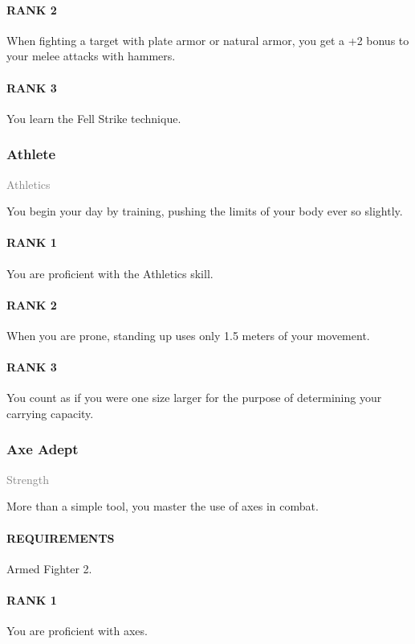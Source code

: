 \paragraph{RANK 2} When fighting a target with plate armor or natural armor, you get a +2 bonus to your melee attacks with hammers.
\paragraph{RANK 3} You learn the Fell Strike technique.

\subsubsection{Athlete} \label{feat::athlete}
\small \textcolor{gray}{Athletics}

\normalsize
You begin your day by training, pushing the limits of your body ever so slightly.
\paragraph{RANK 1} You are proficient with the Athletics skill.
\paragraph{RANK 2} When you are prone, standing up uses only 1.5 meters of your movement.
\paragraph{RANK 3} You count as if you were one size larger for the purpose of determining your carrying capacity.

\subsubsection{Axe Adept} \label{feat::axeadept}
\small{\textcolor{gray}{Strength}}

\normalsize
More than a simple tool, you master the use of axes in combat.
\paragraph{REQUIREMENTS} Armed Fighter 2.
\paragraph{RANK 1} You are proficient with axes.
